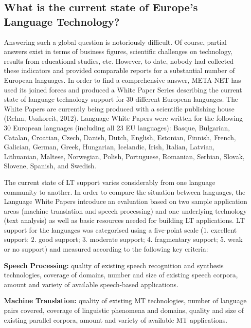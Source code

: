 \documentclass[10pt, plain]{../../metanetpaper}
\begin{document}
\begin{multicols}{2}

\subsection{What is the current state of Europe’s Language Technology?}
\label{sec:what-current-state}

Answering such a global question is notoriously difficult. Of course, partial answers exist in terms of business figures, scientific challenges on technology, results from educational studies, etc. However, to date, nobody had collected these indicators and provided comparable reports for a substantial number of European languages. In order to find a comprehensive answer, META-NET has used its joined forces and produced a White Paper Series describing the current state of language technology support for 30 different European languages. The White Papers are currently being produced with a scientific publishing house (Rehm, Uszkoreit, 2012). Language White Papers were written for the following 30 European languages (including all 23 EU languages): Basque, Bulgarian, Catalan, Croatian, Czech, Danish, Dutch, English, Estonian, Finnish, French, Galician, German, Greek, Hungarian, Icelandic, Irish, Italian, Latvian, Lithuanian, Maltese, Norwegian, Polish, Portuguese, Romanian, Serbian, Slovak, Slovene, Spanish, and Swedish.

The current state of LT support varies considerably from one language community to another. In order to compare the situation between languages, the Language White Papers introduce an evaluation based on two sample application areas (machine translation and speech processing) and one underlying technology (text analysis) as well as basic resources needed for building LT applications. LT support for the languages was categorised using a five-point scale (1. excellent support; 2. good support; 3. moderate support; 4. fragmentary support; 5. weak or no support) and measured according to the following key criteria:

\textbf{Speech Processing:} quality of existing speech recognition and synthesis technologies, coverage of domains, number and size of existing speech corpora, amount and variety of available speech-based applications.

\textbf{Machine Translation:} quality of existing MT technologies, number of language pairs covered, coverage of linguistic phenomena and domains, quality and size of existing parallel corpora, amount and variety of available MT applications.


\end{multicols}
\end{document}
